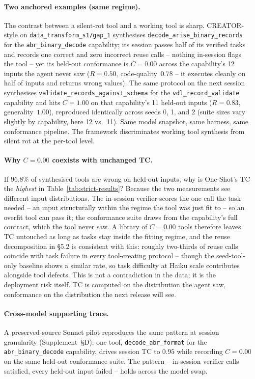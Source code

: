 \documentclass[sigconf,anonymous,review,natbib=false]{acmart}
\begin{document}
\paragraph{Two anchored examples (same regime).}
The contrast between a silent-rot tool and a working tool is sharp. CREATOR-style on \texttt{data\_transform\_s1/gap\_1} synthesises \texttt{decode\_arise\_binary\_records} for the \texttt{abr\_binary\_decode} capability; its session passes half of its verified tasks and records one correct and zero incorrect reuse calls -- nothing in-session flags the tool -- yet its held-out conformance is $C{=}0.00$ across the capability's 12 inputs the agent never saw ($R{=}0.50$, code-quality~$0.78$ -- it executes cleanly on half of inputs and returns wrong values). The same protocol on the next session synthesises \texttt{validate\_records\_against\_schema} for the \texttt{vdl\_record\_validate} capability and hits $C{=}1.00$ on that capability's 11 held-out inputs ($R{=}0.83$, generality~$1.00$), reproduced identically across seeds 0, 1, and 2 (suite sizes vary slightly by capability, here 12 vs.\ 11). Same model snapshot, same harness, same conformance pipeline. The framework discriminates working tool synthesis from silent rot at the per-tool level.

\paragraph{Why $C{=}0.00$ coexists with unchanged TC.}
If $96.8\%$ of synthesised tools are wrong on held-out inputs, why is One-Shot's TC the \emph{highest} in Table~\ref{tab:strict-results}? Because the two measurements see different input distributions. The in-session verifier scores the one call the task needed -- an input structurally within the regime the tool was just fit to -- so an overfit tool can pass it; the conformance suite draws from the capability's full contract, which the tool never saw. A library of $C{=}0.00$ tools therefore leaves TC untouched as long as tasks stay inside the fitting regime, and the reuse decomposition in \S5.2 is consistent with this: roughly two-thirds of reuse calls coincide with task failure in every tool-creating protocol -- though the seed-tool-only baseline shows a similar rate, so task difficulty at Haiku scale contributes alongside tool defects. This is not a contradiction in the data; it is the deployment risk itself. TC is computed on the distribution the agent saw, conformance on the distribution the next release will see.

\paragraph{Cross-model supporting trace.} A preserved-source Sonnet pilot reproduces the same pattern at session granularity (Supplement~\S D): one tool, \texttt{decode\_abr\_format} for the \texttt{abr\_binary\_decode} capability, drives session TC to $0.95$ while recording $C{=}0.00$ on the same held-out conformance suite. The pattern -- in-session verifier calls satisfied, every held-out input failed -- holds across the model swap.
\end{document}
